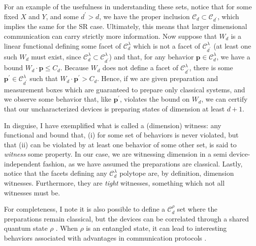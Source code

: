             \begin{figure}
                \centering
                \caption{\todo{}}
                \label{fig:pam-scenarios}
            \end{figure}
            
            For an example of the usefulness in understanding these sets, notice that for some fixed $X$ and $Y$, and some $d^\prime > d$, we have the proper inclusion $\mathcal{C}_{d} \subset \mathcal{C}_{d^\prime}$, which implies the same for the SR case. Ultimately, this means that larger dimensional communication can carry strictly more information. Now suppose that $W_d$ is a linear functional defining some facet of $\mathcal{C}_{d}^\lambda$ which is not a facet of $\mathcal{C}_{d^\prime}^\lambda$ (at least one such $W_d$ must exist, since $\mathcal{C}_{d}^\lambda \subset \mathcal{C}_{d^\prime}^\lambda$) and that, for any behavior $\mathbf{p} \in \mathcal{C}_d^\lambda$, we have a bound $W_d \cdot \mathbf{p} \leq C_d$. Because $W_d$ does not define a facet of $\mathcal{C}_{d^\prime}^\lambda$, there is some $\mathbf{p}^\prime \in \mathcal{C}_{d^\prime}^\lambda$ such that $W_d \cdot \mathbf{p}^\prime > C_d$. Hence, if we are given preparation and measurement boxes which are guaranteed to prepare only classical systems, and we observe some behavior that, like $\mathbf{p}^\prime$, violates the bound on $W_d$, we can certify that our uncharacterized devices is preparing states of dimension at least $d+1$.
            
            In disguise, I have exemplified what is called a (dimension) witness: any functional and bound that, (i) for some set of behaviors is never violated, but that (ii) can be violated by at least one behavior of some other set, is said to \emph{witness} some property. In our case, we are witnessing dimension in a semi device-independent fashion, as we have assumed the preparations are classical. Lastly, notice that the facets defining any $\mathcal{C}_d^\lambda$ polytope are, by definition, dimension witnesses. Furthermore, they are \emph{tight} witnesses, something which not all witnesses must be.
            
            For completeness, I note it is also possible to define a $\mathcal{C}_d^{\rho}$ set where the preparations remain classical, but the devices can be correlated through a shared quantum state $\rho$ \cite{tavakoli_eapam_2021,poderini_pamcriteria_2020}. When $\rho$ is an entangled state, it can lead to interesting behaviors associated with advantages in communication protocols \cite{pawlowski_earacs_2010}.
    
